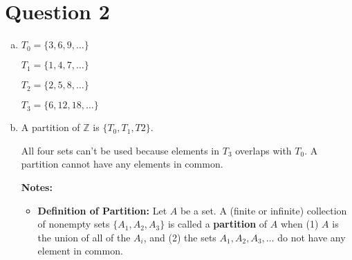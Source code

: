 \documentclass[12pt]{article}
\begin{document}
\section*{Question 2}
\begin{enumerate}[a.]
    \item

    $T_0 = \{3,6,9,\dots\}$

    $T_1 = \{1,4,7,\dots\}$

    $T_2 = \{2,5,8,\dots\}$

    $T_3 = \{6,12,18,\dots\}$

    \item

    A partition of $\mathbb{Z}$ is $\{T_0,T_1,T2\}$.

    \bigskip

    All four sets can't be used because elements in $T_3$ overlaps with $T_0$.
    A partition cannot have any elements in common.

    \bigskip

    \textbf{Notes:}

    \begin{itemize}
        \item \textbf{Definition of Partition:} Let $A$ be a set. A (finite or
        infinite) collection of nonempty sets $\{A_1,A_2,A_3\}$ is called a
        \textbf{partition} of $A$ when (1) $A$ is the union of all of the $A_i$,
        and (2) the sets $A_1,A_2,A_3,\dots$ do not have any element in common.

    \end{itemize}

\end{enumerate}
\end{document}
